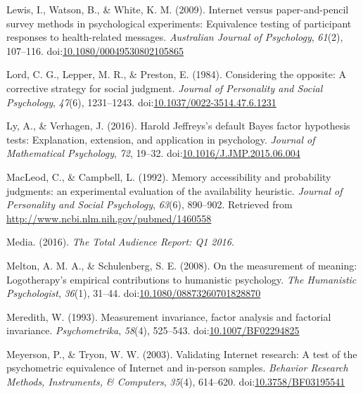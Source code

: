 \documentclass[english,man, mask]{apa6}
\theoremstyle{definition}
\theoremstyle{definition}
\theoremstyle{definition}
\theoremstyle{remark}
\begin{document}
\hypertarget{ref-Lewis2009}{}
Lewis, I., Watson, B., \& White, K. M. (2009). Internet versus
paper-and-pencil survey methods in psychological experiments:
Equivalence testing of participant responses to health-related messages.
\emph{Australian Journal of Psychology}, \emph{61}(2), 107--116.
doi:\href{https://doi.org/10.1080/00049530802105865}{10.1080/00049530802105865}

\hypertarget{ref-Lord1984}{}
Lord, C. G., Lepper, M. R., \& Preston, E. (1984). Considering the
opposite: A corrective strategy for social judgment. \emph{Journal of
Personality and Social Psychology}, \emph{47}(6), 1231--1243.
doi:\href{https://doi.org/10.1037/0022-3514.47.6.1231}{10.1037/0022-3514.47.6.1231}

\hypertarget{ref-Ly2016}{}
Ly, A., \& Verhagen, J. (2016). Harold Jeffreys's default Bayes factor
hypothesis tests: Explanation, extension, and application in psychology.
\emph{Journal of Mathematical Psychology}, \emph{72}, 19--32.
doi:\href{https://doi.org/10.1016/J.JMP.2015.06.004}{10.1016/J.JMP.2015.06.004}

\hypertarget{ref-MacLeod1992}{}
MacLeod, C., \& Campbell, L. (1992). Memory accessibility and
probability judgments: an experimental evaluation of the availability
heuristic. \emph{Journal of Personality and Social Psychology},
\emph{63}(6), 890--902. Retrieved from
\url{http://www.ncbi.nlm.nih.gov/pubmed/1460558}

\hypertarget{ref-Media2016}{}
Media. (2016). \emph{The Total Audience Report: Q1 2016}.

\hypertarget{ref-Melton2008}{}
Melton, A. M. A., \& Schulenberg, S. E. (2008). On the measurement of
meaning: Logotherapy's empirical contributions to humanistic psychology.
\emph{The Humanistic Psychologist}, \emph{36}(1), 31--44.
doi:\href{https://doi.org/10.1080/08873260701828870}{10.1080/08873260701828870}

\hypertarget{ref-Meredith1993}{}
Meredith, W. (1993). Measurement invariance, factor analysis and
factorial invariance. \emph{Psychometrika}, \emph{58}(4), 525--543.
doi:\href{https://doi.org/10.1007/BF02294825}{10.1007/BF02294825}

\hypertarget{ref-Meyerson2003}{}
Meyerson, P., \& Tryon, W. W. (2003). Validating Internet research: A
test of the psychometric equivalence of Internet and in-person samples.
\emph{Behavior Research Methods, Instruments, \& Computers},
\emph{35}(4), 614--620.
doi:\href{https://doi.org/10.3758/BF03195541}{10.3758/BF03195541}
\end{document}
